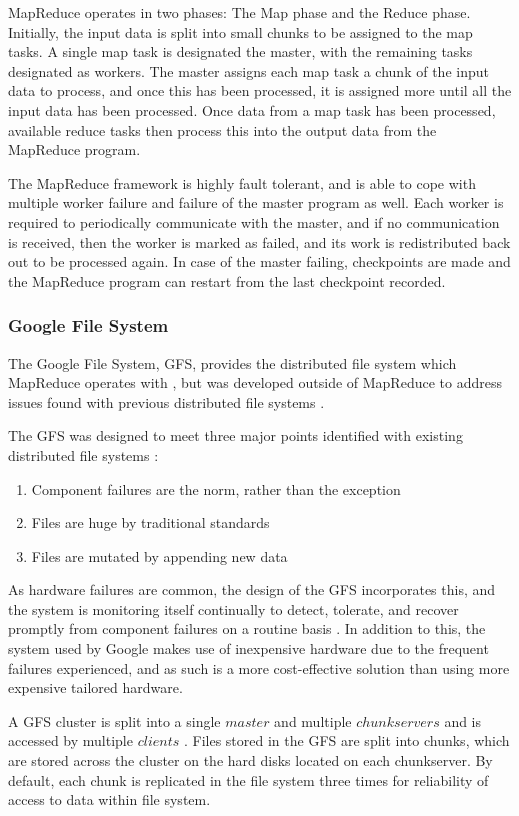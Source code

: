 MapReduce operates in two phases: The Map phase and the Reduce phase. Initially, the input data is split into small chunks to be assigned to the map tasks. A single map task is designated the master, with the remaining tasks designated as workers. The master assigns each map task a chunk of the input data to process, and once this has been processed, it is assigned more until all the input data has been processed. Once data from a map task has been processed, available reduce tasks then process this into the output data from the MapReduce program.

The MapReduce framework is highly fault tolerant, and is able to cope with multiple worker failure and failure of the master program as well. Each worker is required to periodically communicate with the master, and if no communication is received, then the worker is marked as failed, and its work is redistributed back out to be processed again. In case of the master failing, checkpoints are made and the MapReduce program can restart from the last checkpoint recorded.

\subsubsection{Google File System}
The Google File System, GFS, provides the distributed file system which MapReduce operates with \cite{mapreduce}, but was developed outside of MapReduce to address issues found with previous distributed file systems \cite{gfs}.

The GFS was designed to meet three major points identified with existing distributed file systems \cite{gfs}:
\begin{enumerate}
	\item Component failures are the norm, rather than the exception
	\item Files are huge by traditional standards
	\item Files are mutated by appending new data
\end{enumerate}

As hardware failures are common, the design of the GFS incorporates this, and the system is monitoring itself continually to detect, tolerate, and recover promptly from component failures on a routine basis \cite{gfs}. In addition to this, the system used by Google makes use of inexpensive hardware due to the frequent failures experienced, and as such is a more cost-effective solution than using more expensive tailored hardware.

A GFS cluster is split into a single $master$ and multiple $chunkservers$ and is accessed by multiple $clients$ \cite{gfs}. Files stored in the GFS are split into chunks, which are stored across the cluster on the hard disks located on each chunkserver. By default, each chunk is replicated in the file system three times for reliability of access to data within file system.

